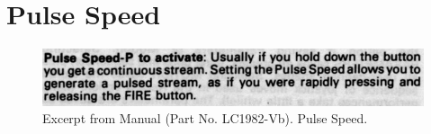 \chapter{Pulse Speed} 
\lstset{style=6502Style}

\begin{figure}[H]
    \centering
    \begin{adjustbox}{width=10.5cm,margin=0cm}
      \includegraphics[width=12cm]{src/pulsespeed/pulsespeed.png}%
    \end{adjustbox}
    \caption{
      Excerpt from Manual (Part No. LC1982-Vb). Pulse Speed.
      }
\end{figure}


